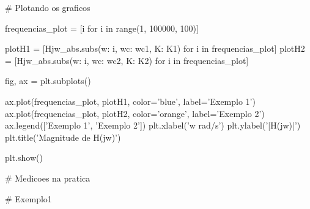 \begin{python}
    # Plotando os graficos

    frequencias_plot = [i for i in range(1, 100000, 100)]

    plotH1 = [Hjw_abs.subs({w: i, wc: wc1, K: K1}) for i in frequencias_plot]
    plotH2 = [Hjw_abs.subs({w: i, wc: wc2, K: K2}) for i in frequencias_plot]

    fig, ax = plt.subplots()

    ax.plot(frequencias_plot, plotH1, color='blue', label='Exemplo 1')
    ax.plot(frequencias_plot, plotH2, color='orange', label='Exemplo 2')
    ax.legend(['Exemplo 1', 'Exemplo 2'])
    plt.xlabel('w rad/s')
    plt.ylabel('|H(jw)|')
    plt.title('Magnitude de H(jw)')


    plt.show()

    # Medicoes na pratica

    # Exemplo1

\end{python}